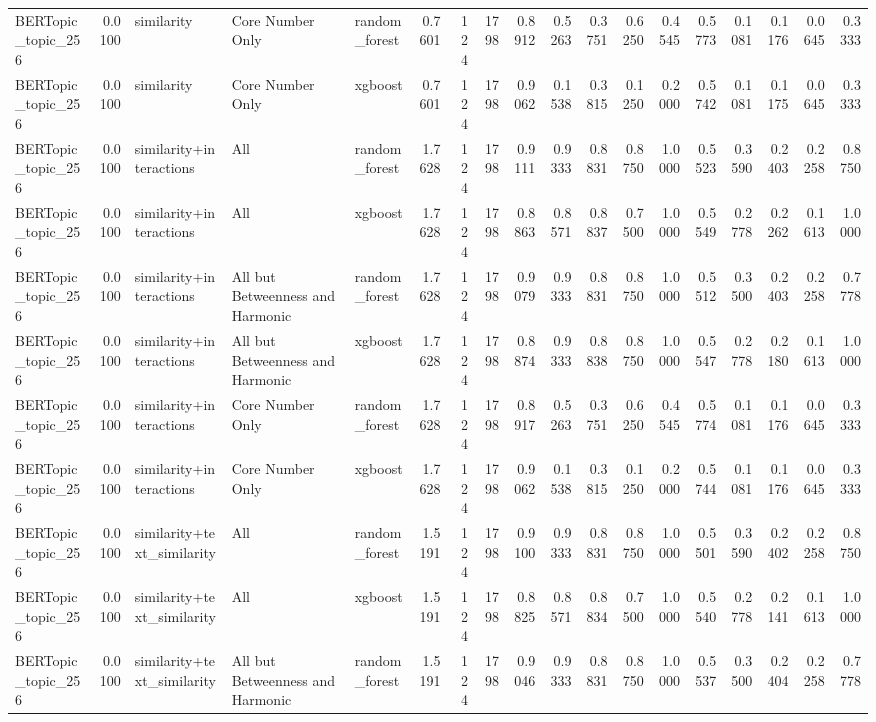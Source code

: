 \begin{tabular}{lrlllrrrrrrrrrrrrr}
BERTopic_topic_256 & 0.0100 & similarity & Core Number Only & random_forest & 0.7601 & 124 & 1798 & 0.8912 & 0.5263 & 0.3751 & 0.6250 & 0.4545 & 0.5773 & 0.1081 & 0.1176 & 0.0645 & 0.3333 \\
BERTopic_topic_256 & 0.0100 & similarity & Core Number Only & xgboost & 0.7601 & 124 & 1798 & 0.9062 & 0.1538 & 0.3815 & 0.1250 & 0.2000 & 0.5742 & 0.1081 & 0.1175 & 0.0645 & 0.3333 \\
BERTopic_topic_256 & 0.0100 & similarity+interactions & All & random_forest & 1.7628 & 124 & 1798 & 0.9111 & 0.9333 & 0.8831 & 0.8750 & 1.0000 & 0.5523 & 0.3590 & 0.2403 & 0.2258 & 0.8750 \\
BERTopic_topic_256 & 0.0100 & similarity+interactions & All & xgboost & 1.7628 & 124 & 1798 & 0.8863 & 0.8571 & 0.8837 & 0.7500 & 1.0000 & 0.5549 & 0.2778 & 0.2262 & 0.1613 & 1.0000 \\
BERTopic_topic_256 & 0.0100 & similarity+interactions & All but Betweenness and Harmonic & random_forest & 1.7628 & 124 & 1798 & 0.9079 & 0.9333 & 0.8831 & 0.8750 & 1.0000 & 0.5512 & 0.3500 & 0.2403 & 0.2258 & 0.7778 \\
BERTopic_topic_256 & 0.0100 & similarity+interactions & All but Betweenness and Harmonic & xgboost & 1.7628 & 124 & 1798 & 0.8874 & 0.9333 & 0.8838 & 0.8750 & 1.0000 & 0.5547 & 0.2778 & 0.2180 & 0.1613 & 1.0000 \\
BERTopic_topic_256 & 0.0100 & similarity+interactions & Core Number Only & random_forest & 1.7628 & 124 & 1798 & 0.8917 & 0.5263 & 0.3751 & 0.6250 & 0.4545 & 0.5774 & 0.1081 & 0.1176 & 0.0645 & 0.3333 \\
BERTopic_topic_256 & 0.0100 & similarity+interactions & Core Number Only & xgboost & 1.7628 & 124 & 1798 & 0.9062 & 0.1538 & 0.3815 & 0.1250 & 0.2000 & 0.5744 & 0.1081 & 0.1176 & 0.0645 & 0.3333 \\
BERTopic_topic_256 & 0.0100 & similarity+text_similarity & All & random_forest & 1.5191 & 124 & 1798 & 0.9100 & 0.9333 & 0.8831 & 0.8750 & 1.0000 & 0.5501 & 0.3590 & 0.2402 & 0.2258 & 0.8750 \\
BERTopic_topic_256 & 0.0100 & similarity+text_similarity & All & xgboost & 1.5191 & 124 & 1798 & 0.8825 & 0.8571 & 0.8834 & 0.7500 & 1.0000 & 0.5540 & 0.2778 & 0.2141 & 0.1613 & 1.0000 \\
BERTopic_topic_256 & 0.0100 & similarity+text_similarity & All but Betweenness and Harmonic & random_forest & 1.5191 & 124 & 1798 & 0.9046 & 0.9333 & 0.8831 & 0.8750 & 1.0000 & 0.5537 & 0.3500 & 0.2404 & 0.2258 & 0.7778 \\

\end{tabular}
